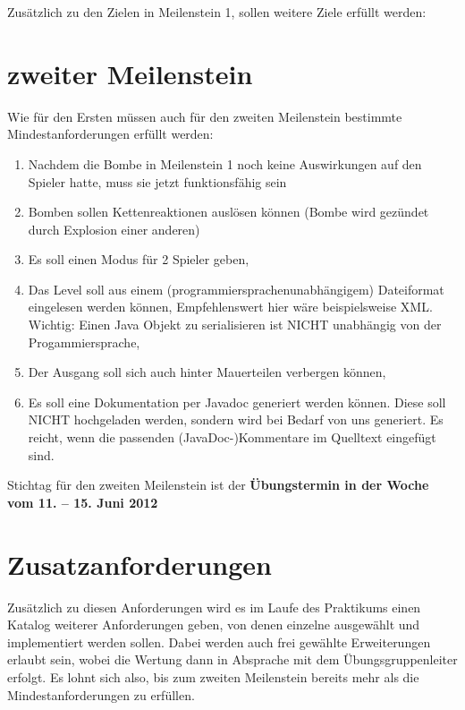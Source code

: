 \documentclass{programmierpraktikum}
\subtitle{Bomberman}
\begin{document}
\maketitle
Zusätzlich zu den Zielen in Meilenstein 1, sollen weitere Ziele erfüllt werden:
%
\section{zweiter Meilenstein}
Wie für den Ersten müssen auch für den zweiten Meilenstein bestimmte Mindestanforderungen erfüllt werden:
\begin{enumerate}
  \item Nachdem die Bombe in Meilenstein 1 noch keine Auswirkungen auf den Spieler hatte, muss sie jetzt funktionsfähig sein
  \item Bomben sollen Kettenreaktionen auslösen können (Bombe wird gezündet durch Explosion einer anderen)
  \item Es soll einen Modus für 2 Spieler geben,
  \item Das Level soll aus einem (programmiersprachenunabhängigem) Dateiformat eingelesen werden können, Empfehlenswert hier wäre beispielsweise XML. Wichtig: Einen Java Objekt zu serialisieren ist NICHT unabhängig von der Progammiersprache,
  \item Der Ausgang soll sich auch hinter Mauerteilen verbergen können,
  \item Es soll eine Dokumentation per Javadoc generiert werden können. Diese soll NICHT hochgeladen werden, sondern wird bei Bedarf von uns generiert. Es reicht, wenn die passenden (JavaDoc-)Kommentare im Quelltext eingefügt sind.
\end{enumerate}
Stichtag für den zweiten Meilenstein ist der \textbf{Übungstermin in der Woche vom 11. -- 15. Juni 2012}
\section{Zusatzanforderungen}
Zusätzlich zu diesen Anforderungen wird es im Laufe des Praktikums einen Katalog weiterer Anforderungen geben, von denen einzelne ausgewählt und implementiert werden sollen. Dabei werden auch frei gewählte Erweiterungen erlaubt sein, wobei die Wertung dann in Absprache mit dem Übungsgruppenleiter erfolgt. Es lohnt sich also, bis zum zweiten Meilenstein bereits mehr als die Mindestanforderungen zu erfüllen.
\end{document}
